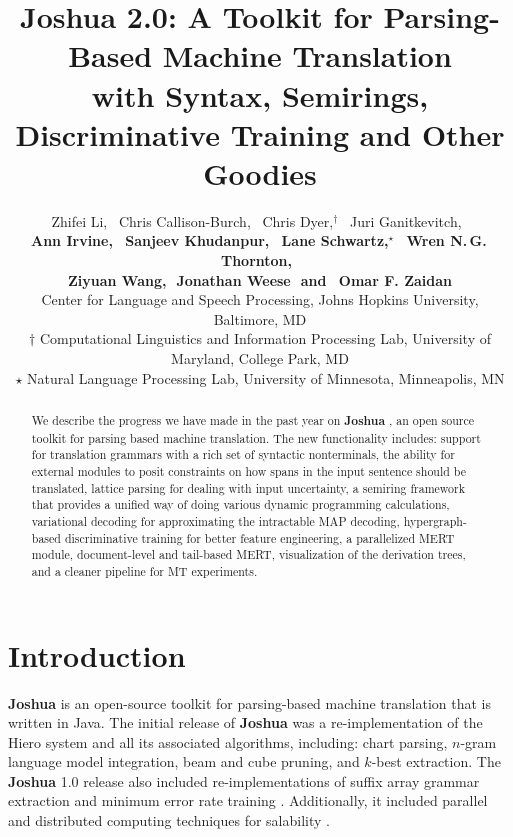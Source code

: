 \documentclass[11pt]{article}
\title{Joshua 2.0: A Toolkit for Parsing-Based Machine Translation \\with Syntax, Semirings, Discriminative Training and Other Goodies }
\author{
Zhifei Li,\,\,\,
Chris Callison-Burch,\,\,\,
Chris Dyer,$^\dagger$\,\,\,
Juri Ganitkevitch,\,\,\,
\\ {\bf
Ann Irvine,\,\,\,  
Sanjeev Khudanpur,\,\,\,
Lane Schwartz,$^\star$\,\,\, 
Wren N.\,G.\,Thornton,\,\,\,}
\\ {\bf
Ziyuan Wang,\,\,
Jonathan Weese\,\,
{\textnormal{and}}
\,\,\,Omar F. Zaidan
}\\
Center for Language and Speech Processing, Johns Hopkins University, Baltimore, MD\\
$\dagger$ Computational Linguistics and Information Processing Lab, University of Maryland, College Park, MD\\
$\star$ Natural Language Processing Lab, University of Minnesota, Minneapolis, MN }
\date{}
\newcommand{\joshua}{\textbf{Joshua}\xspace}
\begin{document}
\maketitle
\begin{abstract}
We describe the progress we have made in the past year on \textbf{Joshua} \cite{joshua-wmt09}, 
an open source toolkit for parsing based machine translation.
The new functionality includes: 
support for translation grammars with a rich set of syntactic nonterminals,
the ability for external modules to posit constraints on how spans in the input sentence should be translated,  
lattice parsing for dealing with input uncertainty,
a semiring framework that provides a unified way of doing various dynamic programming calculations, 
variational decoding for approximating the intractable MAP decoding,
hypergraph-based discriminative training for better feature engineering, 
a parallelized MERT module,
document-level and tail-based MERT,
visualization of the derivation trees, 
and a cleaner pipeline for MT experiments.
\end{abstract}



\section{Introduction}

\joshua is an open-source toolkit for parsing-based machine translation that is
written in Java. The initial release of \joshua  \cite{joshua-wmt09} was
a re-implementation of the Hiero system \cite{hiero-2007} and all its
associated algorithms, including: chart parsing, $n$-gram language model
integration, beam and cube pruning, and $k$-best extraction.  The \joshua 1.0
release also included re-implementations of suffix array grammar extraction
\cite{lopez:2007:EMNLP-CoNLL2007,PBML-2010-Joshua-grammar-extraction} and
minimum error rate training \cite{och-mert,Zaidan2009}.  Additionally, it
included parallel and distributed computing techniques for salability \cite{Joshua-old}. 
\end{document}
